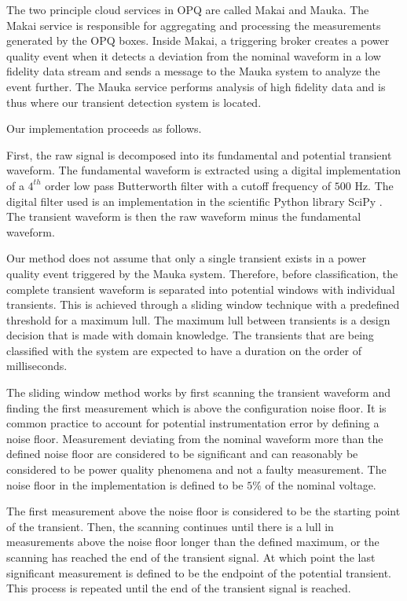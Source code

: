 \documentclass[10pt, conference, compsocconf]{IEEEtran}
\begin{document}
The two principle cloud services in OPQ are called Makai and Mauka.  The Makai service is responsible for aggregating and processing the measurements generated by the OPQ boxes. Inside Makai, a triggering broker creates a power quality event when it detects a deviation from the nominal waveform in a low fidelity data stream and sends a message to the Mauka system to analyze the event further. The Mauka service performs analysis of high fidelity data and is thus where our transient detection system is located.

Our implementation proceeds as follows.

First, the raw signal is decomposed into its fundamental and potential transient waveform. The fundamental waveform is extracted using a digital implementation of a $4^{th}$ order low pass Butterworth filter with a cutoff frequency of $500$ Hz. The digital filter used is an implementation in the scientific Python library SciPy \cite{scipy:2019}. The transient waveform is then the raw waveform minus the fundamental waveform.

Our method does not assume that only a single transient exists in a power quality event triggered by the Mauka system. Therefore, before classification, the complete transient waveform is separated into potential windows with individual transients. This is achieved through a sliding window technique with a predefined threshold for a maximum lull. The maximum lull between transients is a design decision that is made with domain knowledge. The transients that are being classified with the system are expected to have a duration on the order of milliseconds.

The sliding window method works by first scanning the transient waveform and finding the first measurement which is above the configuration noise floor. It is common practice to account for potential instrumentation error by defining a noise floor. Measurement deviating from the nominal waveform more than the defined noise floor are considered to be significant and can reasonably be considered to be power quality phenomena and not a faulty measurement. The noise floor in the implementation is defined to be $5\%$ of the nominal voltage.

The first measurement above the noise floor is considered to be the starting point of the transient. Then, the scanning continues until there is a lull in measurements above the noise floor longer than the defined maximum, or the scanning has reached the end of the transient signal. At which point the last significant measurement is defined to be the endpoint of the potential transient. This process is repeated until the end of the transient signal is reached.
\end{document}
